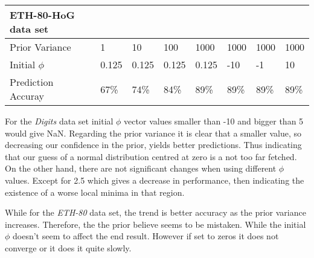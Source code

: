 \documentclass[12pt]{article}
\begin{document}
\begin{table}[h]
\begin{tabular}{l|lllllll}
ETH-80-HoG data set &  &  &  &  &  &  &  \\ \hline
Prior Variance & \multicolumn{1}{l|}{1} & \multicolumn{1}{l|}{10} & \multicolumn{1}{l|}{100} & \multicolumn{1}{l|}{1000} & \multicolumn{1}{l|}{1000} & \multicolumn{1}{l|}{1000} & \multicolumn{1}{l|}{1000} \\ \hline
Initial $\phi$ & \multicolumn{1}{l|}{0.125} & \multicolumn{1}{l|}{0.125} & \multicolumn{1}{l|}{0.125} & \multicolumn{1}{l|}{0.125} & \multicolumn{1}{l|}{-10} & \multicolumn{1}{l|}{-1} & \multicolumn{1}{l|}{10} \\ \hline
Prediction Accuray & \multicolumn{1}{l|}{67\%} & \multicolumn{1}{l|}{74\%} & \multicolumn{1}{l|}{84\%} & \multicolumn{1}{l|}{89\%} & \multicolumn{1}{l|}{89\%} & \multicolumn{1}{l|}{89\%} & \multicolumn{1}{l|}{89\%} \\ \hline
\end{tabular}
\end{table}

For the \textit{Digits} data set initial $\phi$ vector values smaller than -10 and bigger than 5 would give NaN.
Regarding the prior variance it is clear that a smaller value, so decreasing our confidence in the prior, yields better predictions.
Thus indicating that our guess of a normal distribution centred at zero is a not too far fetched. On the other hand, there are not significant changes when using different $\phi$ values. 
Except for 2.5 which gives a decrease in performance, then indicating the existence of a worse local minima in that region.

While for the \textit{ETH-80} data set, the trend is better accuracy as the prior variance increases.
Therefore, the the prior believe seems to be mistaken.
While the initial $\phi$ doesn't seem to affect the end result.
However if set to zeros it does not converge or it does it quite slowly.
 
\end{document}

